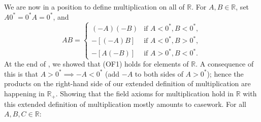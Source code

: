\documentclass[12pt]{article}
\newcommand{\newp}{\vspace{5mm}}
\theoremstyle{definition}
\begin{document}
\newp

We are now in a position to define multiplication on all of \( \mathbb{R} \). For \( A, B \in \mathbb{R} \), set \( A 0^* = 0^* A = 0^* \), and
\[
    AB = \begin{cases}
        (-A)(-B) & \text{if } A < 0^*, B < 0^*, \\
        -[(-A)B] & \text{if } A < 0^*, B > 0^*, \\
        -[A(-B)] & \text{if } A > 0^*, B < 0^*.
    \end{cases}
\]
At the end of , we showed that (OF1) holds for elements of \( \mathbb{R} \). A consequence of this is that \( A > 0^* \implies -A < 0^* \) (add \( -A \) to both sides of \( A > 0^* \)); hence the products on the right-hand side of our extended definition of multiplication are happening in \( \mathbb{R}_+ \). Showing that the field axioms for multiplication hold in \( \mathbb{R} \) with this extended definition of multiplication mostly amounts to casework. For all \( A, B, C \in \mathbb{R} \):
\end{document}
